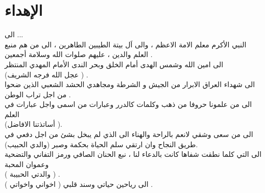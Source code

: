 \chapter*{الإهداء}

\begin{center}
	الى ... \\[10pt]

	النبي  الأكرم معلم الامة الاعظم ، والى اَل بيتة الطيبين الطاهرين ، الى من هم منبع العلم والدين ، عليهم صلوات الله وسلامة أجمعين . \\ [10pt]
	الى امين الله وشمس الهدى أمام الخلق وبحر الندى الأمام المهدي المنتظر \\
	(عجل الله فرجه الشريف ) . \\[10pt]
	
	الى شهداء العراق الابرار من الجيش و الشرطة ومجاهدي الحشد الشعبي الذين ضحوا من اجل تراب الوطن . \\[10pt]
	
	الى من علمونا حروفا من ذهب وكلمات كالدرر وعبارات من اسمى واجل عبارات في العلم  \\
	(أساتذتنا الافاضل ). \\[10pt]
	
	الى من سعى وشقي لانعم بالراحة والهناء الى الذي لم يبخل بشئ من اجل دفعي في طريق النجاح وان ارتقي سلم الحياة بحكمة وصبر (والدي الحبيب). \\[10pt]
	
	الى التي كلما نطقت شفاها كانت بالدعاء لنا ، نبع الحنان الصافي ورمز التفاني والتضحية وعموان المحبة\\
	  ( والدتي الحبيبة ) . \\[10pt]
	
	الى رياحين حياتي وسند قلبي ( اخواني واخواتي ) .
\end{center}
